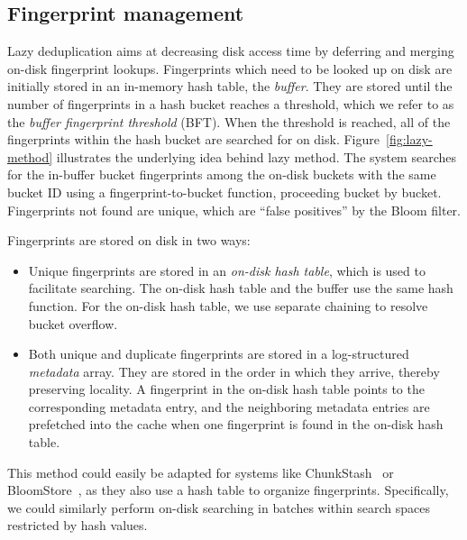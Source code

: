 \documentclass[prodmode,acmtecs]{acmsmall}
\begin{document}
\fi


\subsection{Fingerprint management}

Lazy deduplication aims at decreasing disk access time by deferring and merging on-disk fingerprint lookups.  Fingerprints which need to be looked up on disk are initially stored in an in-memory hash table, the \emph{buffer}.  They are stored until the number of fingerprints in a hash bucket reaches a threshold, which we refer to as the \emph{buffer fingerprint threshold} (BFT).  When the threshold is reached, all of the fingerprints within the hash bucket are searched for on disk.  Figure~\ref{fig:lazy-method} illustrates the underlying idea behind lazy method.  The system searches for the in-buffer bucket fingerprints among the on-disk buckets with the same bucket ID using a fingerprint-to-bucket function, proceeding bucket by bucket.  Fingerprints not found are unique, which are ``false positives'' by the Bloom filter.


Fingerprints are stored on disk in two ways:
\begin{itemize}
 \item Unique fingerprints are stored in an \emph{on-disk hash table}, which is used to facilitate searching.  The on-disk hash table and the buffer use the same hash function.  For the on-disk hash table, we use separate chaining to resolve bucket overflow.
 \item Both unique and duplicate fingerprints are stored in a log-structured \emph{metadata} array.  They are stored in the order in which they arrive, thereby preserving locality. A fingerprint in the on-disk hash table points to the corresponding metadata entry, and the neighboring metadata entries are prefetched into the cache when one fingerprint is found in the on-disk hash table.
\end{itemize}

This method could easily be adapted for systems like ChunkStash~\cite{debnath2010chunkstash} or BloomStore~\cite{lu2012bloomstore}, as they also use a hash table to organize fingerprints. Specifically, we could similarly perform on-disk searching in batches within search spaces restricted by hash values.
\end{document}
